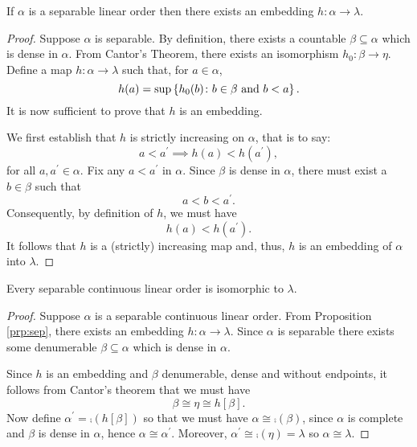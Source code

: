 \begin{prp}[Separability]\label{prp:sep}
	If $\alpha$ is a separable linear order then there exists an embedding
	$h\colon\alpha\to\lambda$.
\end{prp}
\begin{proof}
	Suppose $\alpha$ is separable.  By definition, there exists a countable
	$\beta\subseteq\alpha$ which is dense in $\alpha$.  From Cantor's Theorem, there
	exists an isomorphism $h_{0}\colon\beta\to\eta$. Define a map
	$h\colon\alpha\to\lambda$ such that, for $a\in\alpha$,
	\begin{equation}
		h(a)=\sup\left\lbrace h_{0}(b)\colon b\in\beta\text{ and }b<a \right\rbrace.
	\end{equation}
	It is now sufficient to prove that $h$ is an embedding.

	We first establish that $h$ is strictly increasing on $\alpha$, that is to
	say:
	\begin{equation}
		a<a^{\prime}\implies h(a)<h(a^{\prime}),
	\end{equation}
	for all $a,a^{\prime}\in\alpha$.  Fix any $a<a^{\prime}$ in $\alpha$. Since
	$\beta$ is dense in $\alpha$, there must exist a $b\in\beta$ such that
	\begin{equation}
		a<b<a^{\prime}.
	\end{equation}
	Consequently, by definition of $h$, we must have
	\begin{equation}
		h(a)<h(a^{\prime}).
	\end{equation}
	It follows that $h$ is a (strictly) increasing map and, thus, $h$ is
	an embedding of $\alpha$ into $\lambda$.
\end{proof}

\begin{thm}\label{thm:rchar}
	Every separable continuous linear order is isomorphic to $\lambda$.
\end{thm}
\begin{proof}
	Suppose $\alpha$ is a separable continuous linear order.  From Proposition
	\ref{prp:sep}, there exists an embedding $h\colon\alpha\to\lambda$.  Since
	$\alpha$ is separable there exists some denumerable $\beta\subseteq\alpha$
	which is dense in $\alpha$.

	Since $h$ is an embedding and $\beta$ denumerable, dense and without
	endpoints, it follows from Cantor's theorem that we must have
	\begin{equation}
		\beta\cong\eta\cong h[\beta].
	\end{equation}
	Now define $\alpha^\prime=\comp(h[\beta])$ so that we must have
	$\alpha\cong\comp(\beta)$, since $\alpha$ is complete and $\beta$ is dense
	in $\alpha$, hence $\alpha\cong\alpha^{\prime}$.  Moreover,
	$\alpha^{\prime}\cong\comp(\eta)=\lambda$ so $\alpha\cong\lambda$.
\end{proof}


